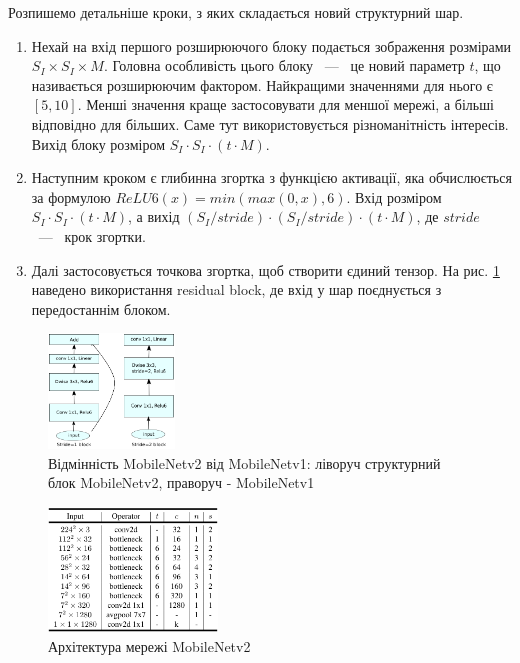 Розпишемо детальніше кроки, з яких складається новий структурний шар.
\begin{enumerate}
    \item Нехай на вхід першого розширюючого блоку подається зображення розмірами $S_I \times S_I \times M$.
          Головна особливість цього блоку ~---~ це новий параметр $t$, що називається розширюючим фактором.
          Найкращими значеннями для нього є $[5,10]$. Менші значення краще застосовувати для меншої мережі,
          а більші відповідно для більших. Саме тут використовується різноманітність інтересів.
          Вихід блоку розміром $S_I \cdot  S_I \cdot  (t\cdot M)$.
    \item Наступним кроком є глибинна згортка з функцією активації,
          яка обчислюється за формулою $ReLU6(x) =  min(max(0,x),6)$.
          Вхід розміром $S_I \cdot  S_I \cdot  (t\cdot M)$, а вихід $(S_I/stride) \cdot  (S_I/stride) \cdot  (t\cdot M)$,
          де  $stride$ ~---~ крок згортки.
    \item Далі застосовується точкова згортка, щоб створити єдиний тензор. На
          рис. \ref{fig:cnn:mobilenetv2_layer} наведено використання residual block, де вхід у шар
          поєднується з передостаннім блоком.
\end{enumerate}
\begin{figure}[H]
    \centering
    \includegraphics[width=0.3\textwidth]{images/cnn_mobilenetv2_layer}
    \caption{Відмінність MobileNetv2 від MobileNetv1: ліворуч структурний блок MobileNetv2,
        праворуч - MobileNetv1   \cite{mobilenetv2}
        \label{fig:cnn:mobilenetv2_layer}
    }
\end{figure}

\begin{figure}[H]
    \centering
    \includegraphics[width=0.4\textwidth]{images/cnn_mobilenetv2_architecture}
    \caption{Архітектура мережі MobileNetv2     \cite{mobilenetv2}
        \label{fig:cnn:mobilenetv2_architecture}
    }
\end{figure}

